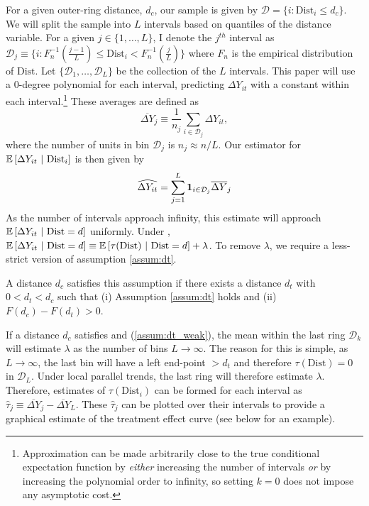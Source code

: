 \documentclass[12pt]{article}
\newcommand{\dist}{\text{Dist}}
\begin{document}
For a given outer-ring distance, $d_c$, our sample is given by $\mathcal{D} = \{ i : \dist_i \leq d_c \}$. We will split the sample into $L$ intervals based on quantiles of the distance variable. For a given $j \in \{1, \dots, L\}$, I denote the $j^{th}$ interval as $\mathcal{D}_j \equiv\{ i : F_n^{-1}(\frac{j-1}{L}) \leq \dist_i < F_n^{-1}(\frac{j}{L}) \}$ where $F_n$ is the empirical distribution of $\dist$. Let $\{ \mathcal{D}_1, \dots, \mathcal{D}_L \}$ be the collection of the $L$ intervals. This paper will use a $0$-degree polynomial for each interval, predicting $\Delta Y_{it}$ with a constant within each interval.\footnote{Approximation can be made arbitrarily close to the true conditional expectation function by \emph{either} increasing the number of intervals \emph{or} by increasing the polynomial order to infinity, so setting $k = 0$ does not impose any asymptotic cost.} These averages are defined as 
\[
    \overline{\Delta Y}_j \equiv \frac{1}{n_j} \sum_{i \in \mathcal{D}_j} \Delta Y_{it},
\]
where the number of units in bin $\mathcal{D}_j$ is $n_j \approx n/L$. Our estimator for $\condexpec{\Delta Y_{it}}{\dist_i}$ is then given by
\[
    \widehat{\Delta Y_{it}} = \sum_{j = 1}^{L} \mathbf{1}_{i \in \mathcal{D}_j} \overline{\Delta Y}_j
\]
As the number of intervals approach infinity, this estimate will approach $\condexpec{\Delta Y_{it}}{\dist = d}$ uniformly. Under , $\condexpec{\Delta Y_{it}}{\dist = d} \equiv \condexpec{\tau(\dist)}{\dist = d} + \lambda$. To remove $\lambda$, we require a less-strict version of assumption \ref{assum:dt}.

\begin{assumption}[$d_t$ is within $d_c$]\label{assum:dt_weak}
    A distance $d_c$ satisfies this assumption if there exists a distance $d_t$ with $0 < d_t < d_c$ such that (i) Assumption \ref{assum:dt} holds and (ii) $F(d_c) - F(d_t) > 0$.
\end{assumption}

If a distance $d_c$ satisfies  and (\ref{assum:dt_weak}), the mean within the last ring $\mathcal{D}_k$ will estimate $\lambda$ as the number of bins $L \to \infty$. The reason for this is simple, as $L \to \infty$, the last bin will have a left end-point $> d_t$ and therefore $\tau(\dist) = 0$ in $\mathcal{D}_L$. Under local parallel trends, the last ring will therefore estimate $\lambda$. Therefore, estimates of $\tau(\dist_i)$ can be formed for each interval as $\hat{\tau}_j \equiv \overline{\Delta Y}_j - \overline{\Delta Y}_L$. These $\hat{\tau}_j$ can be plotted over their intervals to provide a graphical estimate of the treatment effect curve (see below for an example).
\end{document}
